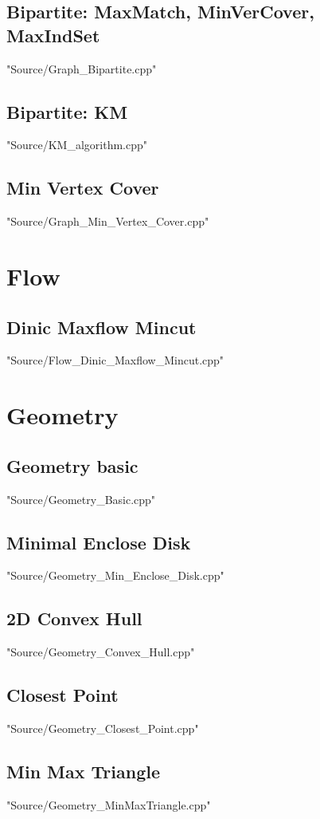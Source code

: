 \documentclass [12pt,twocolumn,oneside]{article}
\begin{document}
\subsection{Bipartite: MaxMatch, MinVerCover, MaxIndSet}
 {"Source/Graph_Bipartite.cpp"}

\subsection{Bipartite: KM}
 {"Source/KM_algorithm.cpp"}

\subsection{Min Vertex Cover}
 {"Source/Graph_Min_Vertex_Cover.cpp"}




\newpage
\section{Flow}
\subsection{Dinic Maxflow Mincut}
 {"Source/Flow_Dinic_Maxflow_Mincut.cpp"}




\newpage
\section{Geometry}
\subsection{Geometry basic}
 {"Source/Geometry_Basic.cpp"}

\subsection{Minimal Enclose Disk}
 {"Source/Geometry_Min_Enclose_Disk.cpp"}

\subsection{2D Convex Hull}
 {"Source/Geometry_Convex_Hull.cpp"}

\subsection{Closest Point}
 {"Source/Geometry_Closest_Point.cpp"}

\subsection{Min Max Triangle}
 {"Source/Geometry_MinMaxTriangle.cpp"}
\end{document}
